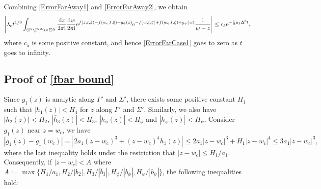 \documentclass[cmp]{svjour}
\numberwithin{theorem}{section}
\numberwithin{equation}{section}
\def\ii{{\rm i}}
\begin{document}
Combining \eqref{ErrorFarAway1} and \eqref{ErrorFarAway2}, we obtain 
\begin{align}\label{ErrorFarCase1}
	\left| \lambda_c t^{1/3} \int_{( \Gamma' \backslash {\Gamma'}^{\Delta} ) \times  \Sigma^{\Delta}  } \frac{\mathrm{d} z}{2 \pi \ii} \frac{\mathrm{d} w}{2 \pi \ii} \mathrm{e}^{ f(z, t, \xi) - f(w_c , t, \xi) + g_{\phi}(z) }  \mathrm{e}^{ - f(w , t, \zeta) + f(w_c , t, \zeta) + g_{\psi}(w) }    \frac{1}{w-z} \right| \leq c_5 \mathrm{e}^{ - \frac{1}{2} a_1 \Delta^3 t },
\end{align}
where $c_5$ is some positive constant, and hence \eqref{ErrorFarCase1} goes to zero as $t$ goes to infinity.



\subsection{Proof of \eqref{fbar bound}}
\label{Upper_Bound_Kc}

Since $g_1(z)$ is analytic along $\Gamma'$ and $\Sigma'$, there exists some positive constant $H_1$ such that $|h_1(z)| < H_1$ for $z$ along $\Gamma'$ and $\Sigma'$. Similarly, we also have $|h_2(z)| < H_2$, $|\bar{h}_3(z)| < H_3$, $|h_{\phi}(z)| < H_{\phi}$ and $|h_{\psi}(z)| < H_{\psi}$. Consider $g_1(z)$ near $z = w_c$, we have
\begin{equation}\label{g1 estm1}
	\left|g_1(z)-g_1(w_c)\right| = \left| 2 a_1 (z-w_c)^3 + (z-w_c)^4 h_1(z) \right|  \leq 2 a_1 |z-w_c|^3 + H_1 |z-w_c|^4 \leq 3a_1 |z-w_c|^3,
\end{equation}
where the last inequality holds under the restriction that $|z-w_c| \leq H_1 / a_1$. Consequently, if $|z-w_c|<A$ where $ A:=\max \{H_1 / a_1, H_2 / |b_2|, H_3 / |\bar{b}_3|, H_{\phi} / |b_{\phi}| , H_{\psi} / |b_{\psi}| \}$, the following inequalities hold:
\end{document}
